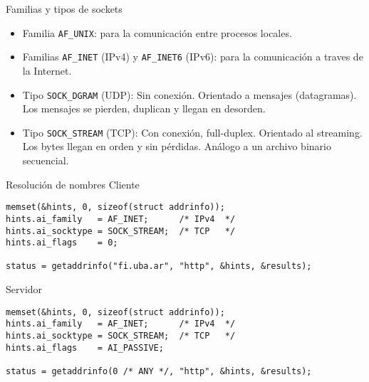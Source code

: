 \begin{frame}{Familias y tipos de sockets}
   \begin{itemize}
     \item<1-> Familia \lstinline[style=normal]!AF_UNIX!: para la comunicaci\'on entre procesos locales.
     \item<2-> Familias \lstinline[style=normal]!AF_INET! (IPv4) y \lstinline[style=normal]!AF_INET6! (IPv6): para la comunicaci\'on a traves de la Internet.
    \end{itemize}
    \begin{itemize}
        \item<3-> Tipo \lstinline[style=normal]!SOCK_DGRAM! (UDP): Sin conexi\'on. Orientado a mensajes (datagramas). Los mensajes se pierden, duplican y llegan en desorden.
        \item<4-> Tipo \lstinline[style=normal]!SOCK_STREAM! (TCP): Con conexi\'on, full-duplex. Orientado al streaming. Los bytes llegan en orden y sin p\'erdidas. \alert{An\'alogo a un archivo binario secuencial.}
    \end{itemize}
\end{frame}

\begin{frame}[fragile]{Resoluci\'on de nombres}
    Cliente
      \begin{lstlisting}[style=normal]
memset(&hints, 0, sizeof(struct addrinfo));
hints.ai_family   = AF_INET;      /* IPv4  */
hints.ai_socktype = SOCK_STREAM;  /* TCP   */
hints.ai_flags    = 0;

status = getaddrinfo("fi.uba.ar", "http", &hints, &results);
      \end{lstlisting}
    Servidor
      \begin{lstlisting}[style=normal]
memset(&hints, 0, sizeof(struct addrinfo));
hints.ai_family   = AF_INET;      /* IPv4  */
hints.ai_socktype = SOCK_STREAM;  /* TCP   */
hints.ai_flags    = AI_PASSIVE;

status = getaddrinfo(0 /* ANY */, "http", &hints, &results);
      \end{lstlisting}
\end{frame}

%
%
%
%

